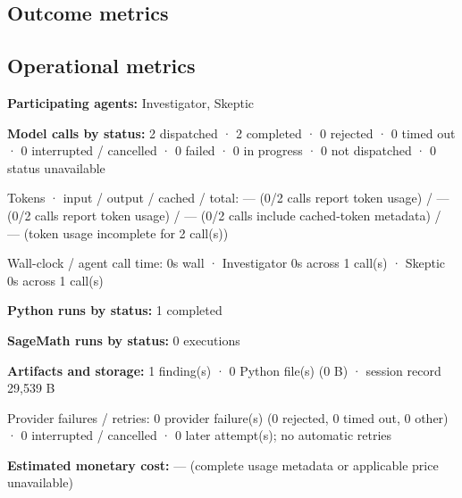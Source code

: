 \documentclass[11pt]{article}
\begin{document}
\subsection{Outcome metrics}
\subsection{Operational metrics}
\textbf{Participating agents:} Investigator, Skeptic\par
\textbf{Model calls by status:} 2 dispatched · 2 completed · 0 rejected · 0 timed out · 0 interrupted / cancelled · 0 failed · 0 in progress · 0 not dispatched · 0 status unavailable\par
Tokens · input / output / cached / total: — (0/2 calls report token usage) / — (0/2 calls report token usage) / — (0/2 calls include cached-token metadata) / — (token usage incomplete for 2 call(s))\par
Wall-clock / agent call time: 0s wall · Investigator 0s across 1 call(s) · Skeptic 0s across 1 call(s)\par
\textbf{Python runs by status:} 1 completed\par
\textbf{SageMath runs by status:} 0 executions\par
\textbf{Artifacts and storage:} 1 finding(s) · 0 Python file(s) (0 B) · session record 29,539 B\par
Provider failures / retries: 0 provider failure(s) (0 rejected, 0 timed out, 0 other) · 0 interrupted / cancelled · 0 later attempt(s); no automatic retries\par
\textbf{Estimated monetary cost:} — (complete usage metadata or applicable price unavailable)\par
\end{document}
